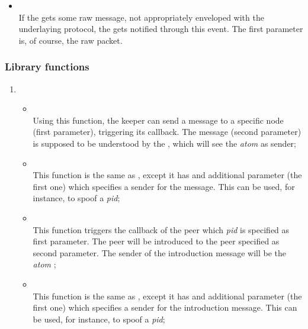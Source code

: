 \begin{itemize}
        \item {} \\
            If the  gets some raw message, not
            appropriately enveloped with the underlaying protocol, the
             gets notified through this event. The first
            parameter is, of course, the raw packet.

        \end{itemize}

    \subsubsection{Library functions}

        \begin{enumerate}
        \item   {}

            \begin{itemize}

            \item {} \\
                Using this function, the keeper can send a message to a
                specific node (first parameter), triggering its
                 callback. The message
                (second parameter) is supposed to be understood by the
                , which will see the \emph{atom}
                 as sender;

            \item {} \\
                This function is the same as , except it has
                and additional parameter (the first one) which specifies a
                sender for the message. This can be used, for instance, to
                spoof a \emph{pid};

            \item {} \\
                This function triggers the 
                callback of the peer which \emph{pid} is specified as
                first parameter. The peer will be introduced to the peer
                specified as second parameter. The sender of the
                introduction message will be the \emph{atom}
                ;

            \item {} \\
                This function is the same as , except
                it has and additional parameter (the first one) which
                specifies a sender for the introduction message. This can
                be used, for instance, to spoof a \emph{pid};


\end{itemize}
\end{enumerate}
